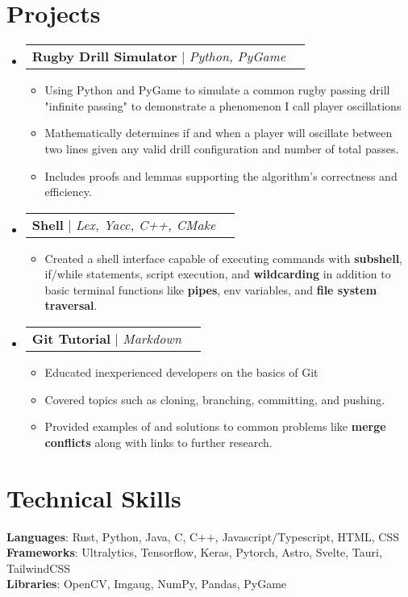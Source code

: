 \documentclass[letterpaper,11pt]{article}
\makeatletter
\newcommand{\resumeItem}[1]{
  \item\small{
    {#1 \vspace{-2pt}}
  }
}
\newcommand{\resumeProjectHeading}[1]{
    \item
    \begin{tabular*}{0.97\textwidth}{l@{\extracolsep{\fill}}r}
      \small#1 \\
    \end{tabular*}\vspace{-8.5pt}
}
\newcommand{\resumeSubHeadingListStart}{\begin{itemize}[leftmargin=0.1in, label={}]}
\newcommand{\resumeSubHeadingListEnd}{\end{itemize}}
\newcommand{\resumeItemListStart}{\begin{itemize}}
\newcommand{\resumeItemListEnd}{\end{itemize}\vspace{-5pt}}
\makeatother
\begin{document}
\section{Projects}

    \resumeSubHeadingListStart
      \resumeProjectHeading
          {\textbf{Rugby Drill Simulator} $|$ \emph{Python, PyGame}}
          \resumeItemListStart
            \resumeItem{Using Python and PyGame to simulate a common rugby passing drill "infinite passing" to demonstrate a phenomenon I call player oscillations
            }
            \resumeItem{Mathematically determines if and when a player will oscillate between two lines given any valid drill configuration and number of total passes.}
            \resumeItem{Includes proofs and lemmas supporting the algorithm's correctness and efficiency. }
          \resumeItemListEnd

      \resumeProjectHeading
          {\textbf{Shell} $|$ \emph{Lex, Yacc, C++, CMake}}
          \resumeItemListStart
            \resumeItem{Created a shell interface capable of executing commands with \textbf{subshell}, if/while statements, script execution, and \textbf{wildcarding} in addition to basic terminal functions like \textbf{pipes}, env variables, and \textbf{file system traversal}.
            }
          \resumeItemListEnd
         
      \resumeProjectHeading
          {\textbf{Git Tutorial} $|$ \emph{Markdown}}
          \resumeItemListStart
            \resumeItem{Educated inexperienced developers on the basics of Git}
            \resumeItem{Covered topics such as cloning, branching, committing, and pushing.}
            \resumeItem{Provided examples of and solutions to common problems like \textbf{merge conflicts} along with links to further research.}
          \resumeItemListEnd
         
    \resumeSubHeadingListEnd


%
\section{Technical Skills}
 \begin{itemize}[leftmargin=0.15in, label={}]
    \small{\item{
     \textbf{Languages}{: Rust, Python, Java, C, C++, Javascript/Typescript, HTML, CSS} \\
     \textbf{Frameworks}{: Ultralytics, Tensorflow, Keras, Pytorch, Astro, Svelte, Tauri, TailwindCSS} \\
     \textbf{Libraries}{: OpenCV, Imgaug, NumPy, Pandas, PyGame} \\
    }}
 \end{itemize}


\end{document}
